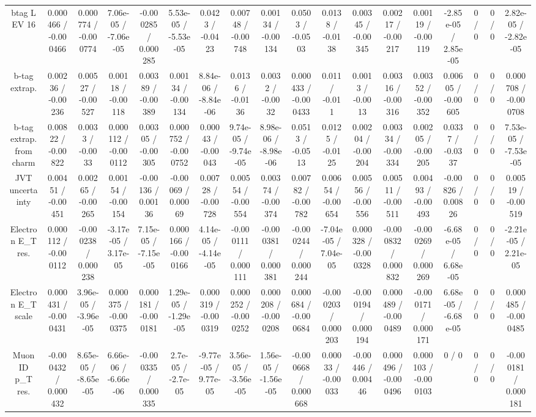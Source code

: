 \documentclass[10pt]{article}
\begin{document}
\begin{table}[htbp]
\begin{center}
\begin{tabular}{|c|c|c|c|c|c|c|c|c|c|c|c|c|c|c|c|c|c|}
  btag L EV 16 & 0.000466 / -0.000466 & 0.000774 / -0.000774 & 7.06e-05 / -7.06e-05 & -0.000285 / 0.000285 & 5.53e-05 / -5.53e-05 & 0.0423 / -0.0423 & 0.00748 / -0.00748 & 0.00134 / -0.00134 & 0.0503 / -0.0503 & 0.0138 / -0.0138 & 0.00345 / -0.00345 & 0.00217 / -0.00217 & 0.00119 / -0.00119 & -2.85e-05 / 2.85e-05 & 0 / 0 & 0 / 0 & 2.82e-05 / -2.82e-05 \\ 
  b-tag extrap. & 0.00236 / -0.00236 & 0.00527 / -0.00527 & 0.00118 / -0.00118 & 0.00389 / -0.00389 & 0.00134 / -0.00134 & 8.84e-06 / -8.84e-06 & 0.0136 / -0.0136 & 0.0032 / -0.0032 & 0.000433 / -0.000433 & 0.011 / -0.011 & 0.0013 / -0.0013 & 0.00316 / -0.00316 & 0.00352 / -0.00352 & 0.00605 / -0.00605 & 0 / 0 & 0 / 0 & 0.000708 / -0.000708 \\ 
  b-tag extrap. from charm & 0.00822 / -0.00822 & 0.0033 / -0.0033 & 0.000112 / -0.000112 & 0.00305 / -0.00305 & 0.000752 / -0.000752 & 0.00043 / -0.00043 & 9.74e-05 / -9.74e-05 & 8.98e-06 / -8.98e-06 & 0.0513 / -0.0513 & 0.0125 / -0.0125 & 0.00204 / -0.00204 & 0.00334 / -0.00334 & 0.00205 / -0.00205 & 0.0337 / -0.0337 & 0 / 0 & 0 / 0 & 7.53e-05 / -7.53e-05 \\ 
  JVT uncertainty & 0.00451 / -0.00451 & 0.00265 / -0.00265 & 0.00154 / -0.00154 & -0.00136 / 0.00136 & -0.00069 / 0.00069 & 0.00728 / -0.00728 & 0.00554 / -0.00554 & 0.00374 / -0.00374 & 0.00782 / -0.00782 & 0.00654 / -0.00654 & 0.00556 / -0.00556 & 0.00511 / -0.00511 & 0.00493 / -0.00493 & -0.00826 / 0.00826 & 0 / 0 & 0 / 0 & 0.00519 / -0.00519 \\ 
  Electron E_{T} res. & 0.000112 / -0.000112 & -0.000238 / 0.000238 & -3.17e-05 / 3.17e-05 & 7.15e-05 / -7.15e-05 & 0.000166 / -0.000166 & 4.14e-05 / -4.14e-05 & -0.000111 / 0.000111 & -0.000381 / 0.000381 & -0.000244 / 0.000244 & -7.04e-05 / 7.04e-05 & 0.000328 / -0.000328 & -0.000832 / 0.000832 & -0.000269 / 0.000269 & -6.68e-05 / 6.68e-05 & 0 / 0 & 0 / 0 & -2.21e-05 / 2.21e-05 \\ 
  Electron E_{T} scale & 0.000431 / -0.000431 & 3.96e-05 / -3.96e-05 & 0.000375 / -0.000375 & 0.000181 / -0.000181 & 1.29e-05 / -1.29e-05 & 0.000319 / -0.000319 & 0.000252 / -0.000252 & 0.000208 / -0.000208 & 0.000684 / -0.000684 & -0.000203 / 0.000203 & -0.000194 / 0.000194 & 0.000489 / -0.000489 & -0.000171 / 0.000171 & 6.68e-05 / -6.68e-05 & 0 / 0 & 0 / 0 & 0.000485 / -0.000485 \\ 
  Muon ID p_{T} res. & -0.000432 / 0.000432 & 8.65e-05 / -8.65e-05 & 6.66e-06 / -6.66e-06 & -0.000335 / 0.000335 & 2.7e-05 / -2.7e-05 & -9.77e-05 / 9.77e-05 & 3.56e-05 / -3.56e-05 & 1.56e-05 / -1.56e-05 & -0.000668 / 0.000668 & 0.00033 / -0.00033 & -0.00446 / 0.00446 & 0.000496 / -0.000496 & 0.000103 / -0.000103 & 0 / 0 & 0 / 0 & 0 / 0 & -0.000181 / 0.000181 \\ 

\end{tabular}
\end{center}
\end{table}
\end{document}
